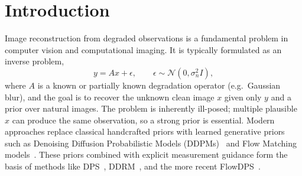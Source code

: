 \documentclass{article}
\begin{document}
\begin{abstract}
\texttt{pixel\_dps\_spectral} adds $+0.46$\,dB ($5/6$ cells) on the
matched-Gaussian grid; and \texttt{flowdps\_rf\_spectral} adds $+0.54$\,dB
($5/6$ cells at $n{=}100$). The two spectral wins show a
\emph{paradoxical reversal} relative to the Tier-B robustness study:
the same spectral-weight algorithm \emph{fails} under operator mismatch
and \emph{wins} on matched-operator data, isolating the mechanism as
``downweight residuals in noise-dominated frequency bands of the
\emph{assumed} operator''. The remaining ten variants are documented
as instructive negative results or near-misses with diagnoses,
including a DPS-vs-$\Pi$-GDM L2-norm/squared convention mismatch, a
guidance-saturation diagnosis from a Heun integrator at $2{\times}$ NFE,
and a path-degeneracy diagnosis from gradient-free SMC.
The findings give concrete guidance for choosing between these
methods under known versus uncertain forward operators.
\end{abstract}

\section{Introduction}\label{sec:intro}

Image reconstruction from degraded observations is a fundamental problem
in computer vision and computational imaging. It is typically formulated
as an inverse problem,
\begin{equation}
  y = A x + \epsilon, \qquad \epsilon \sim \mathcal{N}(0, \sigma_n^2 I),
\end{equation}
where $A$ is a known or partially known degradation operator (e.g.\
Gaussian blur), and the goal is to recover the unknown clean image $x$
given only $y$ and a prior over natural images. The problem is inherently
ill-posed; multiple plausible $x$ can produce the same observation, so a
strong prior is essential. Modern approaches replace classical
handcrafted priors with learned generative priors such as Denoising
Diffusion Probabilistic Models (DDPMs)~\cite{ho2020ddpm} and Flow Matching
models~\cite{lipman2023flow,liu2023rectified}. These priors combined with
explicit measurement guidance form the basis of methods like
DPS~\cite{chung2023dps}, DDRM~\cite{kawar2022ddrm}, and the more recent
FlowDPS~\cite{kim2025flowdps}.
\end{document}
